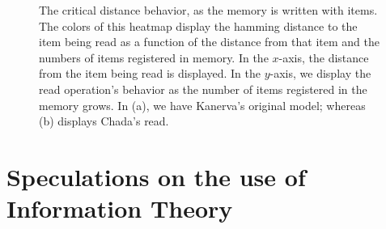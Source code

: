 \documentclass[11pt]{article} %
\begin{document}
\begin{figure}[h!]
\centering



\caption{The critical distance behavior, as the memory is written with items.  The colors of this heatmap display the hamming distance to the item being read as a function of the distance from that item and the numbers of items registered in memory.  In the $x$-axis, the distance from the item being read is displayed. In the $y$-axis, we display the read operation's behavior as the number of items registered in the memory grows.  In (a), we have Kanerva's original model; whereas (b) displays Chada's read.}
\label{fig:crit-dist-10k-writes}

\end{figure}



\section{Speculations on the use of Information Theory}
\end{document}
